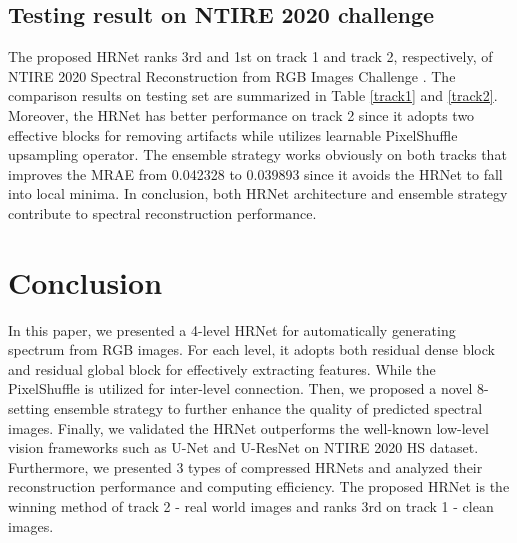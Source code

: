 \documentclass[10pt,twocolumn,letterpaper]{article}
\begin{document}
\subsection{Testing result on NTIRE 2020 challenge}

The proposed HRNet ranks 3rd and 1st on track 1 and track 2, respectively, of NTIRE 2020 Spectral Reconstruction from RGB Images Challenge \cite{NTIREChallenge}. The comparison results on testing set are summarized in Table \ref{track1} and \ref{track2}. Moreover, the HRNet has better performance on track 2 since it adopts two effective blocks for removing artifacts while utilizes learnable PixelShuffle upsampling operator. The ensemble strategy works obviously on both tracks that improves the MRAE from 0.042328 to 0.039893 since it avoids the HRNet to fall into local minima. In conclusion, both HRNet architecture and ensemble strategy contribute to spectral reconstruction performance.

\section{Conclusion}

In this paper, we presented a 4-level HRNet for automatically generating spectrum from RGB images. For each level, it adopts both residual dense block and residual global block for effectively extracting features. While the PixelShuffle is utilized for inter-level connection. Then, we proposed a novel 8-setting ensemble strategy to further enhance the quality of predicted spectral images. Finally, we validated the HRNet outperforms the well-known low-level vision frameworks such as U-Net and U-ResNet on NTIRE 2020 HS dataset. Furthermore, we presented 3 types of compressed HRNets and analyzed their reconstruction performance and computing efficiency. The proposed HRNet is the winning method of track 2 - real world images and ranks 3rd on track 1 - clean images.

{\small


}
\end{document}
